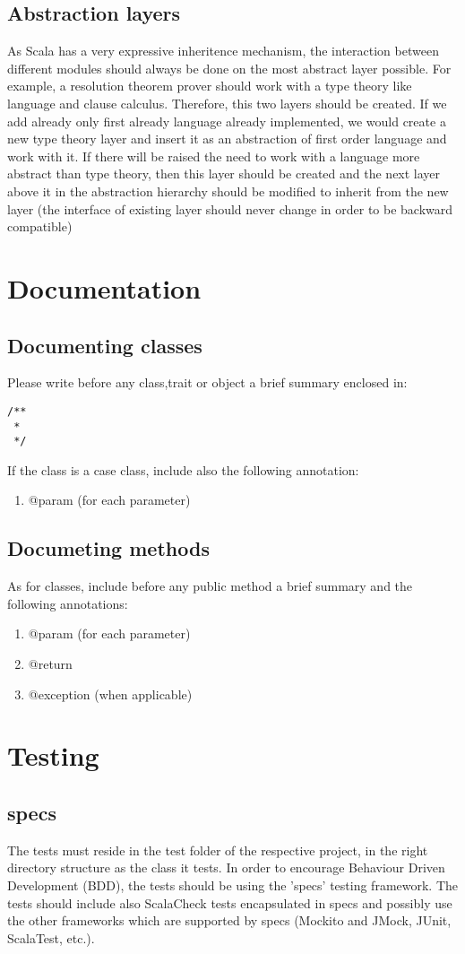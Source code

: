 \documentclass[a4paper, 11pt]{article}
\begin{document}
\subsection{Abstraction layers}
As Scala has a very expressive inheritence mechanism, the interaction between different modules should always be done on the most abstract layer possible. For example, a resolution theorem prover should work with a type theory like language and clause calculus. Therefore, this two layers should be created. If we add already only first already language already implemented, we would create a new type theory layer and insert it as an abstraction of first order language and work with it. If there will be raised the need to work with a language more abstract than type theory, then this layer should be created and the next layer above it in the abstraction hierarchy should be modified to inherit from the new layer (the interface of existing layer should never change in order to be backward compatible) 

\section{Documentation}
\subsection{Documenting classes}
Please write before any class,trait or object a brief summary enclosed in:
\begin{verbatim}  
/**
 *
 */
\end{verbatim}
If the class is a case class, include also the following annotation:
\begin{enumerate}
 \item @param (for each parameter)
\end{enumerate}

\subsection{Documeting methods}
As for classes, include before any public method a brief summary and the following annotations:
\begin{enumerate}
 \item @param (for each parameter)
 \item @return
 \item @exception (when applicable)
\end{enumerate}

\section{Testing}
\subsection{specs}
The tests must reside in the test folder of the respective project, in the right directory structure as the class it tests. In order to encourage Behaviour Driven Development (BDD), the tests should be using the 'specs' testing framework. The tests should include also ScalaCheck tests encapsulated in specs and possibly use the other frameworks which are supported by specs (Mockito and JMock, JUnit, ScalaTest, etc.).
\end{document}
